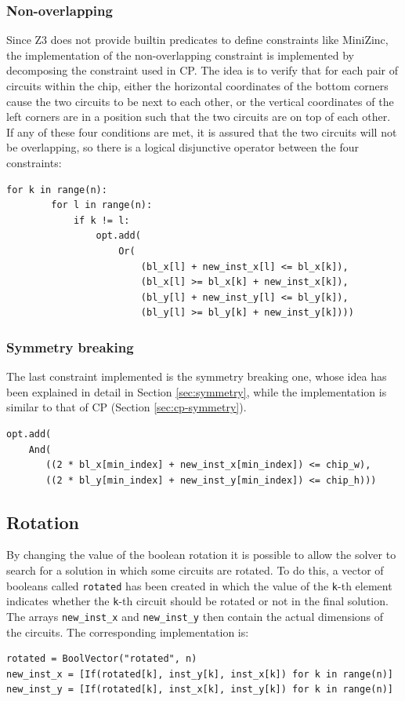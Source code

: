 \documentclass[a4paper, 12pt]{article}
\begin{document}
\subsubsection{Non-overlapping}
Since Z3 does not provide builtin predicates to define constraints like MiniZinc, the implementation of the non-overlapping constraint is implemented by decomposing the constraint used in CP. The idea is to verify that for each pair of circuits within the chip, either the horizontal coordinates of the bottom corners cause the two circuits to be next to each other, or the vertical coordinates of the left corners are in a position such that the two circuits are on top of each other. If any of these four conditions are met, it is assured that the two circuits will not be overlapping, so there is a logical disjunctive operator between the four constraints:
\begin{verbatim}
for k in range(n):
        for l in range(n):
            if k != l:
                opt.add(
                    Or(
                        (bl_x[l] + new_inst_x[l] <= bl_x[k]),
                        (bl_x[l] >= bl_x[k] + new_inst_x[k]),
                        (bl_y[l] + new_inst_y[l] <= bl_y[k]),
                        (bl_y[l] >= bl_y[k] + new_inst_y[k])))
\end{verbatim}

\subsubsection{Symmetry breaking}
The last constraint implemented is the symmetry breaking one, whose idea has been explained in detail in Section \ref{sec:symmetry}, while the implementation is similar to that of CP (Section \ref{sec:cp-symmetry}).
\begin{verbatim}
opt.add(
    And(
       ((2 * bl_x[min_index] + new_inst_x[min_index]) <= chip_w),
       ((2 * bl_y[min_index] + new_inst_y[min_index]) <= chip_h)))
\end{verbatim}

\subsection{Rotation}
By changing the value of the boolean rotation it is possible to allow the solver to search for a solution in which some circuits are rotated. To do this, a vector of booleans called \verb|rotated| has been created in which the value of the \verb|k|-th element indicates whether the \verb|k|-th circuit should be rotated or not in the final solution. The arrays \verb|new_inst_x| and \verb|new_inst_y| then contain the actual dimensions of the circuits. The corresponding implementation is:
\begin{verbatim}
rotated = BoolVector("rotated", n)
new_inst_x = [If(rotated[k], inst_y[k], inst_x[k]) for k in range(n)]
new_inst_y = [If(rotated[k], inst_x[k], inst_y[k]) for k in range(n)]
\end{verbatim}
\end{document}
